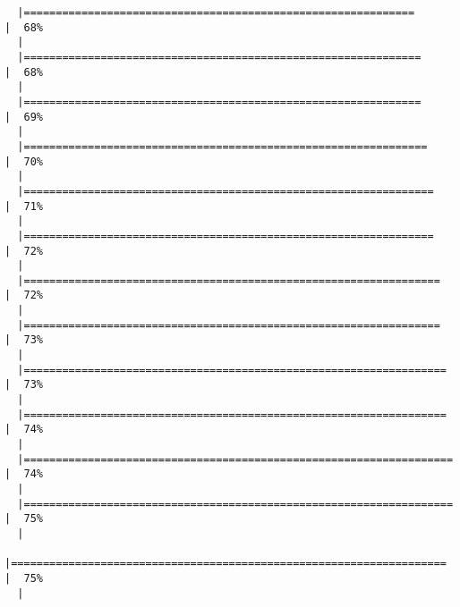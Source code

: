 \documentclass[12pt]{article}
\begin{document}
\begin{verbatim}
  |=============================================================                             |  68%
  |                                                                                                
  |==============================================================                            |  68%
  |                                                                                                
  |==============================================================                            |  69%
  |                                                                                                
  |===============================================================                           |  70%
  |                                                                                                
  |================================================================                          |  71%
  |                                                                                                
  |================================================================                          |  72%
  |                                                                                                
  |=================================================================                         |  72%
  |                                                                                                
  |=================================================================                         |  73%
  |                                                                                                
  |==================================================================                        |  73%
  |                                                                                                
  |==================================================================                        |  74%
  |                                                                                                
  |===================================================================                       |  74%
  |                                                                                                
  |===================================================================                       |  75%
  |                                                                                                
  |====================================================================                      |  75%
  |                                                                                                

\end{verbatim}
\end{document}
